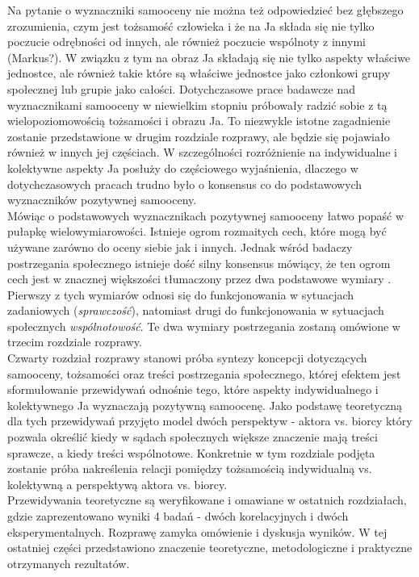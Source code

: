 \documentclass[man]{apa6}
\begin{document}
Na pytanie o wyznaczniki samooceny nie można też odpowiedzieć bez głębszego zrozumienia, czym jest tożsamość człowieka i że na Ja składa się nie tylko poczucie odrębności od innych, ale również poczucie wspólnoty z innymi (Markus?). W związku z tym na obraz Ja składają się nie tylko aspekty właściwe jednostce, ale również takie które są właściwe jednostce jako członkowi grupy społecznej lub grupie jako całości. Dotychczasowe prace badawcze nad wyznacznikami samooceny w niewielkim stopniu próbowały radzić sobie z tą wielopoziomowością tożsamości i obrazu Ja. To niezwykle istotne zagadnienie zostanie przedstawione w drugim rozdziale rozprawy, ale będzie się pojawiało również w innych jej częściach. W szczególności rozróżnienie na indywidualne i kolektywne aspekty Ja posłuży do częściowego wyjaśnienia, dlaczego w dotychczasowych pracach trudno było o konsensus co do podstawowych wyznaczników pozytywnej samooceny.\\

Mówiąc o podstawowych wyznacznikach pozytywnej samooceny łatwo popaść w pułapkę wielowymiarowości. Istnieje ogrom rozmaitych cech, które mogą być używane zarówno do oceny siebie jak i innych. Jednak wśród badaczy postrzegania społecznego istnieje dość silny konsensus mówiący, że ten ogrom cech jest w znacznej większości tłumaczony przez dwa podstawowe wymiary \parencite{judd2005fundamental, fiske2007universal}. Pierwszy z tych wymiarów odnosi się do funkcjonowania w sytuacjach zadaniowych (\emph{sprawczość}), natomiast drugi do funkcjonowania w sytuacjach społecznych \emph{wspólnotowość}. Te dwa wymiary postrzegania zostaną omówione w trzecim rozdziale rozprawy.\\

Czwarty rozdział rozprawy stanowi próba syntezy koncepcji dotyczących samooceny, tożsamości oraz treści postrzegania społecznego, której efektem jest sformułowanie przewidywań odnośnie tego, które aspekty indywidualnego i kolektywnego Ja wyznaczają pozytywną samoocenę. Jako podstawę teoretyczną dla tych przewidywań przyjęto model dwóch perspektyw - aktora vs. biorcy \parencite{abele2014communal} który pozwala określić kiedy w sądach społecznych większe znaczenie mają treści sprawcze, a kiedy treści wspólnotowe. Konkretnie w tym rozdziale podjęta zostanie próba nakreślenia relacji pomiędzy tożsamością indywidualną vs. kolektywną a perspektywą aktora vs. biorcy.\\

Przewidywania teoretyczne są weryfikowane i omawiane w ostatnich rozdziałach, gdzie zaprezentowano wyniki 4 badań - dwóch korelacyjnych i dwóch eksperymentalnych. Rozprawę zamyka omówienie i dyskusja wyników. W tej ostatniej części przedstawiono znaczenie teoretyczne, metodologiczne i praktyczne otrzymanych rezultatów. \\
\newpage 
\end{document}
